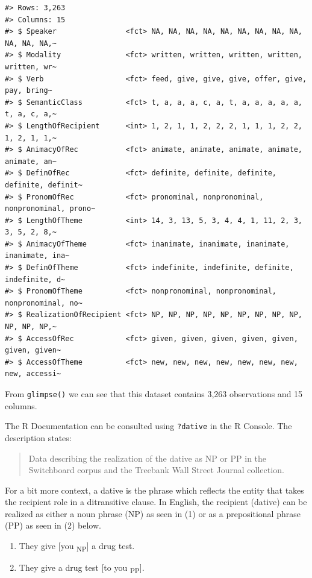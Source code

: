 \documentclass[
  letterpaper,
]{latex/krantz}
\providecommand{\tightlist}{%
  \setlength{\itemsep}{0pt}\setlength{\parskip}{0pt}}\usepackage{longtable,booktabs,array}
\begin{document}
\begin{verbatim}
#> Rows: 3,263
#> Columns: 15
#> $ Speaker                <fct> NA, NA, NA, NA, NA, NA, NA, NA, NA, NA, NA, NA,~
#> $ Modality               <fct> written, written, written, written, written, wr~
#> $ Verb                   <fct> feed, give, give, give, offer, give, pay, bring~
#> $ SemanticClass          <fct> t, a, a, a, c, a, t, a, a, a, a, a, t, a, c, a,~
#> $ LengthOfRecipient      <int> 1, 2, 1, 1, 2, 2, 2, 1, 1, 1, 2, 2, 1, 2, 1, 1,~
#> $ AnimacyOfRec           <fct> animate, animate, animate, animate, animate, an~
#> $ DefinOfRec             <fct> definite, definite, definite, definite, definit~
#> $ PronomOfRec            <fct> pronominal, nonpronominal, nonpronominal, prono~
#> $ LengthOfTheme          <int> 14, 3, 13, 5, 3, 4, 4, 1, 11, 2, 3, 3, 5, 2, 8,~
#> $ AnimacyOfTheme         <fct> inanimate, inanimate, inanimate, inanimate, ina~
#> $ DefinOfTheme           <fct> indefinite, indefinite, definite, indefinite, d~
#> $ PronomOfTheme          <fct> nonpronominal, nonpronominal, nonpronominal, no~
#> $ RealizationOfRecipient <fct> NP, NP, NP, NP, NP, NP, NP, NP, NP, NP, NP, NP,~
#> $ AccessOfRec            <fct> given, given, given, given, given, given, given~
#> $ AccessOfTheme          <fct> new, new, new, new, new, new, new, new, accessi~
\end{verbatim}

From \texttt{glimpse()} we can see that this dataset contains 3,263
observations and 15 columns.

The R Documentation can be consulted using \texttt{?dative} in the R
Console. The description states:

\begin{quote}
Data describing the realization of the dative as NP or PP in the
Switchboard corpus and the Treebank Wall Street Journal collection.
\end{quote}

For a bit more context, a dative is the phrase which reflects the entity
that takes the recipient role in a ditransitive clause. In English, the
recipient (dative) can be realized as either a noun phrase (NP) as seen
in (1) or as a prepositional phrase (PP) as seen in (2) below.

\begin{enumerate}
\def\labelenumi{\arabic{enumi}.}
\tightlist
\item
  They give {[}you \textsubscript{NP}{]} a drug test.
\item
  They give a drug test {[}to you \textsubscript{PP}{]}.
\end{enumerate}
\end{document}
